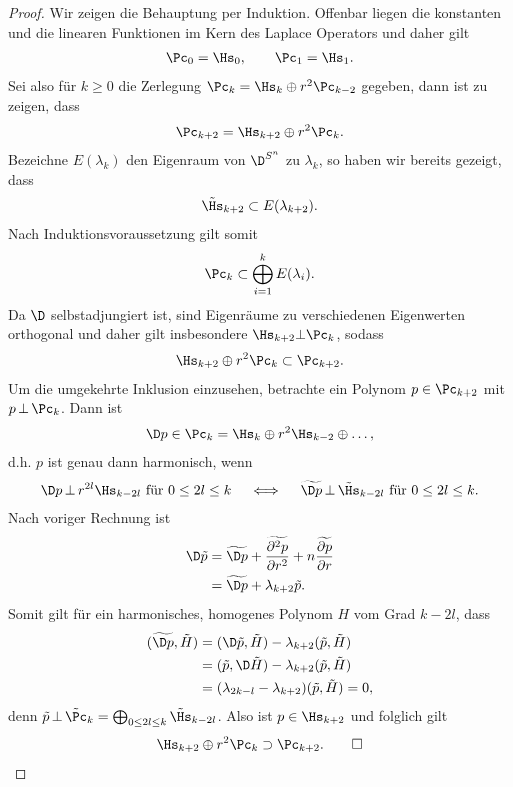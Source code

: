 \documentclass[%
	paper=a5,%
	fleqn,%
	DIV=18,%
	BCOR=0mm,
	fontsize=11pt,
	titlepage=false,%
	bibliography=totoc,
	DIV=18,%
	twoside=true,
	pdftitle=Riemannsche Geometrie,
	pdfauthor=Uwe Semmelmann,
	numbers=noendperiod]%
	{scrbook}
\begin{document}
\begin{proof}
Wir zeigen die Behauptung per Induktion. Offenbar liegen die konstanten und die linearen Funktionen im Kern des Laplace Operators und daher gilt 
\begin{align*}
\Pc_{0} = \Hs_{0},\qquad \Pc_{1} = \Hs_{1}.
\end{align*}
Sei also für $k\ge 0$ die Zerlegung $\Pc_{k} = \Hs_{k}\oplus r^2\Pc_{k-2}$ gegeben, dann ist zu zeigen, dass
\begin{align*}
\Pc_{k+2} = \Hs_{k+2}\oplus r^2\Pc_{k}.
\end{align*}
Bezeichne $E(\lambda_{k})$ den Eigenraum von $\D^{S^n}$ zu $\lambda_{k}$, so haben wir bereits gezeigt, dass
\begin{align*}
\tilde\Hs_{k+2} \subset E(\lambda_{k+2}).
\end{align*}
Nach Induktionsvoraussetzung gilt somit
\begin{align*}
\Pc_{k} \subset \bigoplus_{i=1}^k E(\lambda_{i}).
\end{align*}
Da $\D$ selbstadjungiert ist, sind Eigenräume zu verschiedenen Eigenwerten orthogonal und daher gilt insbesondere $\Hs_{k+2}\bot \Pc_{k}$, sodass
\begin{align*}
\Hs_{k+2}\oplus r^2\Pc_{k} \subset \Pc_{k+2}.
\end{align*}
Um die umgekehrte Inklusion einzusehen, betrachte ein Polynom $p\in\Pc_{k+2}$ mit $p\,\bot\, \Pc_{k}$. Dann ist
\begin{align*}
\D p\in\Pc_{k}=\Hs_{k}\oplus r^2\Hs_{k-2}\oplus \ldots,
\end{align*}
d.h. $p$ ist genau dann harmonisch, wenn
\begin{align*}
\D p \,\bot\, r^{2l}\Hs_{k-2l} \text{ für }0\le 2l\le k
\quad
\iff
\quad
\widetilde{\D p} \,\bot\, \tilde\Hs_{k-2l} \text{ für }0\le 2l\le k.
\end{align*}
Nach voriger Rechnung ist
\begin{align*}
\D \tilde p &= \widetilde{\D p} + \widetilde{\frac{\partial^2 p}{\partial r^2}}
+n\widetilde{\frac{\partial p}{\partial r}}\\
&= \widetilde{\D p} + \lambda_{k+2}\tilde{p}.
\end{align*}
Somit gilt für ein harmonisches, homogenes Polynom $H$ vom Grad $k-2l$, dass
\begin{align*}
(\widetilde{\D p},\tilde{H}) 
&= (\D\tilde{p},\tilde{H}) - \lambda_{k+2}(\tilde{p},\tilde{H})\\
&= (\tilde{p},\D\tilde{H}) - \lambda_{k+2}(\tilde{p},\tilde{H})\\
&= (\lambda_{2k-l}-\lambda_{k+2}) (\tilde{p},\tilde{H}) = 0,
\end{align*}
denn $\tilde p\,\bot\, \tilde\Pc_{k}=\bigoplus_{0\le 2l\le k} \tilde\Hs_{k-2l}$. Also ist $p\in\Hs_{k+2}$ und folglich gilt
\begin{align*}
\Hs_{k+2}\oplus r^2\Pc_{k} \supset \Pc_{k+2}.\qed
\end{align*}
\end{proof}
\end{document}
